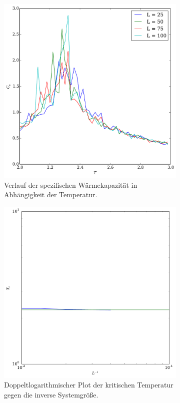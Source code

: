 \documentclass{scrartcl}
\begin{document}
\begin{figure}[H]
    \centering
    \begin{subfigure}{.48\textwidth}
      \includegraphics[width=\textwidth]{plots/crit.pdf}
      \caption{Verlauf der spezifischen Wärmekapazität in Abhängigkeit der Temperatur.}
    \end{subfigure} %
    \begin{subfigure}{.48\textwidth}
      \includegraphics[width=\textwidth]{plots/Tc_L.pdf}
      \caption{Doppeltlogarithmischer Plot der kritischen Temperatur gegen die inverse Systemgröße.}
    \end{subfigure}
    \caption{}
    \label{fig:crit}
\end{figure}
\end{document}
